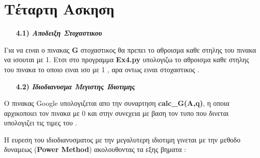\documentclass[a4paper,11pt]{article}
\begin{document}
	\section{Τέταρτη Ασκηση}
	\begin{enumerate}
		\item[\textbf{4.1)}] \emph {\textbf{Αποδειξη Στοχαστικου}}
	\end{enumerate}
	\begin{center}
		Για να ειναι ο πινακας \textbf{G} στοχαστικος θα πρεπει το αθροισμα καθε στηλης του πινακα να ισουται με 1. Ετσι στο προγραμμα \textbf{Ex4.py} υπολογιζω το αθροισμα καθε στηλης του πινακα το οποιο ειναι ισο με 1 , αρα οντως ειναι στοχαστικος . 
	\end{center}
	\begin{enumerate}
		\item[\textbf{4.2)}] \emph {\textbf{Ιδιοδιανυσμα Μεγιστης Ιδιοτιμης}}
	\end{enumerate}
	\begin{center}
		Ο πινακας Google υπολογιζεται απο την συναρτηση \textbf{calc\_G(A,q)}, η οποια αρχικοποιει τον πινακα με 0 και στην συνεχεια με βαση τον τυπο που δινεται υπολογιζει τις τιμες του . 
	\end{center}
	\begin{center}
		Η ευρεση του ιδιοδιανυσματος με την μεγαλυτερη ιδιοτιμη γινεται με την μεθοδο δυναμεως (\textbf{Power Method}) ακολουθοντας τα εξης βηματα : 
	\end{center}
	\begin{enumerate}
		\item[\text{(1)}] {}
		\item[\text{(2)}] {}
		\item[\text{(3)}] {}
		\item[\text{(4)}] {}
		\item[\text{(5)}] {}
	\end{enumerate}
	
\end{document}
